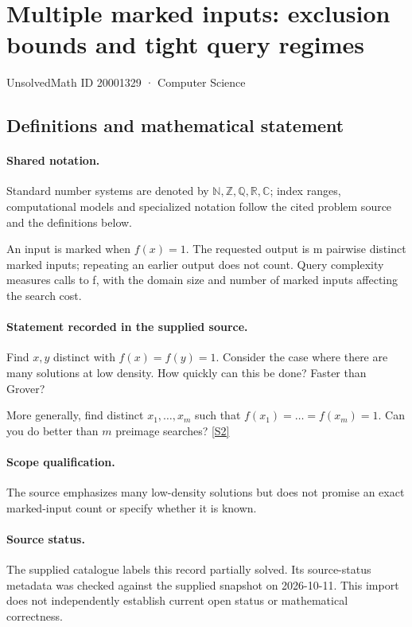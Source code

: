 \documentclass[11pt]{article}
\newcommand{\sref}[2]{\hyperlink{source:#1:#2}{[S#2]}}
\begin{document}
\setcounter{section}{20001328}
\section{Multiple marked inputs: exclusion bounds and tight query regimes}\label{20001329}
{\small\sffamily UnsolvedMath ID 20001329 · Computer Science}
\subsection{Definitions and mathematical statement}

\paragraph{Shared notation.}Standard number systems are denoted by $\mathbb N,\mathbb Z,\mathbb Q,\mathbb R,\mathbb C$; index ranges, computational models and specialized notation follow the cited problem source and the definitions below.


An input is marked when $f(x)=1$. The requested output is m pairwise distinct marked inputs; repeating an earlier output does not count. Query complexity measures calls to f, with the domain size and number of marked inputs affecting the search cost.
\paragraph{Statement recorded in the supplied source.}
Find $x,y$ distinct with $f(x) = f(y) = 1$. Consider the case where there are many solutions at low density. How quickly can this be done? Faster than Grover?

More generally, find distinct $x_1,\dots, x_m$ such that $f(x_1) = \dots = f(x_m) = 1$. Can you do better than $m$ preimage searches? \sref{20001329}{2}
\paragraph{Scope qualification.}
The source emphasizes many low-density solutions but does not promise an exact marked-input count or specify whether it is known.
\paragraph{Source status.}
The supplied catalogue labels this record partially solved. Its source-status metadata was checked against the supplied snapshot on 2026-10-11. This import does not independently establish current open status or mathematical correctness.
\end{document}
